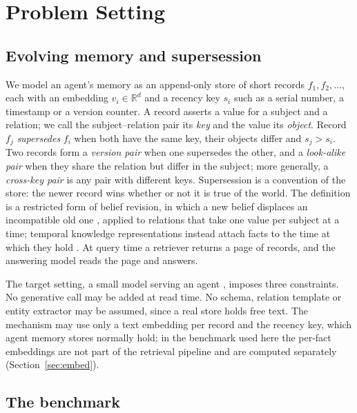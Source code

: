 \documentclass{CUP-JNL-NLP}
\begin{document}
\section{Problem Setting}
\label{sec:problem}

\subsection{Evolving memory and supersession}
\label{sec:setting}

We model an agent's memory as an append-only store of short records $f_1,f_2,\dots$, each with an embedding $v_i\in\mathbb{R}^d$ and a recency key $s_i$ such as a serial number, a timestamp or a version counter. A record asserts a value for a subject and a relation; we call the subject--relation pair its \emph{key} and the value its \emph{object}. Record $f_j$ \emph{supersedes} $f_i$ when both have the same key, their objects differ and $s_j>s_i$. Two records form a \emph{version pair} when one supersedes the other, and a \emph{look-alike pair} when they share the relation but differ in the subject; more generally, a \emph{cross-key pair} is any pair with different keys. Supersession is a convention of the store: the newer record wins whether or not it is true of the world. The definition is a restricted form of belief revision, in which a new belief displaces an incompatible old one \citep{alchourron1985logic}, applied to relations that take one value per subject at a time; temporal knowledge representations instead attach facts to the time at which they hold \citep{dhingra2022timeaware,rasmussen2025zep}. At query time a retriever returns a page of records, and the answering model reads the page and answers.

The target setting, a small model serving an agent \citep{belcak2025small}, imposes three constraints. No generative call may be added at read time. No schema, relation template or entity extractor may be assumed, since a real store holds free text. The mechanism may use only a text embedding per record and the recency key, which agent memory stores normally hold; in the benchmark used here the per-fact embeddings are not part of the retrieval pipeline and are computed separately (Section~\ref{sec:embed}).

\subsection{The benchmark}
\label{sec:benchmark}
\end{document}
